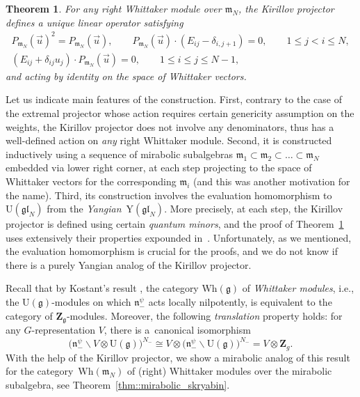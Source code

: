 \documentclass[10pt,a4paper]{amsart}
\numberwithin{equation}{section}
\newtheorem{thmx}{Theorem}
\newcommand{\Z}{\mathbf{Z}}
\newcommand{\g}{\mathfrak{g}}
\newcommand{\n}{\mathfrak{n}}
\newcommand{\m}{\mathfrak{m}}
\newcommand{\gl}{\mathfrak{gl}}
\begin{document}
	\begin{thmx}
		\label{intro_thm::main_thm}
		For any right Whittaker module over $\m_N$, the Kirillov projector defines a unique linear operator satisfying
		\begin{gather*}
			P_{\m_N}(\vec{u})^2 = P_{\m_N}(\vec{u}), \qquad
			P_{\m_N} (\vec{u})\cdot (E_{ij} - \delta_{i,j+1}) = 0,\qquad 1 \leq j < i \leq N, \\
			(E_{ij} + \delta_{ij} u_j)\cdot P_{\m_N} (\vec{u}) = 0,\qquad 1 \leq i \leq j \leq N-1,
		\end{gather*}
		and acting by identity on the space of Whittaker vectors.
	\end{thmx}
	
	Let us indicate main features of the construction. First, contrary to the case of the extremal projector whose action requires certain genericity assumption on the weights, the Kirillov projector does not involve any denominators, thus has a well-defined action on \emph{any} right Whittaker module. Second, it is constructed inductively using a sequence of mirabolic subalgebras $\m_1 \subset \m_2 \subset \dots \subset \m_N$ embedded via lower right corner, at each step projecting to the space of Whittaker vectors for the corresponding $\m_i$ (and this was another motivation for the name). Third, its construction involves the evaluation homomorphism to $\mathrm{U}(\gl_N)$ from the \emph{Yangian}~$\mathrm{Y}(\gl_N)$. More precisely, at each step, the Kirillov projector is defined using certain \emph{quantum minors}, and the proof of Theorem~\ref{intro_thm::main_thm} uses extensively their properties expounded in~\cite{MolevYangians}. Unfortunately, as we mentioned, the evaluation homomorphism is crucial for the proofs, and we do not know if there is a purely Yangian analog of the Kirillov projector.
	
	Recall that by Kostant's result \cite{Kostant}, the category $\mathrm{Wh}(\g)$ of \emph{Whittaker modules}, i.e., the $\mathrm{U}(\g)$-modules on which $\n_-^{\psi}$ acts locally nilpotently, is equivalent to the category of $\Z_{\g}$-modules. Moreover, the following \emph{translation} property holds: for any $G$-representation $V$, there is a~canonical isomorphism
	\[
	\bigl(\n_-^{\psi} \backslash V \otimes \mathrm{U}(\g)\bigr)^{N_-} \cong V \otimes \bigl(\n_-^{\psi} \backslash \mathrm{U}(\g)\bigr)^{N_-} = V \otimes \Z_{g}.
	\]
	With the help of the Kirillov projector, we show a mirabolic analog of this result for the category~$\mathrm{Wh}(\m_N)$ of (right) Whittaker modules over the mirabolic subalgebra, see Theorem~\ref{thm::mirabolic_skryabin}.
	
\end{document}
